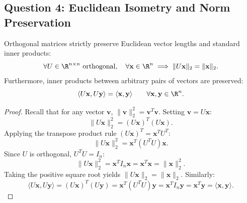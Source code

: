 \subsection{Question 4: Euclidean Isometry and Norm Preservation}

\begin{theorem}
\label{thm:en:orthogonal-isometry}
Orthogonal matrices strictly preserve Euclidean vector lengths and standard inner products:
\begin{equation}
    \forall U \in \R^{n \times n} \text{ orthogonal}, \quad \forall \mathbf{x} \in \R^n \implies \|U\mathbf{x}\|_2 = \|\mathbf{x}\|_2.
\end{equation}
Furthermore, inner products between arbitrary pairs of vectors are preserved:
\begin{equation}
    \langle U\mathbf{x}, U\mathbf{y} \rangle = \langle \mathbf{x}, \mathbf{y} \rangle \qquad \forall \mathbf{x}, \mathbf{y} \in \R^n.
\end{equation}
\end{theorem}

\begin{proof}
Recall that for any vector $\mathbf{v}$, $\|\mathbf{v}\|_2^2 = \mathbf{v}^T \mathbf{v}$. Setting $\mathbf{v} = U\mathbf{x}$:
\begin{equation}
    \|U\mathbf{x}\|_2^2 = (U\mathbf{x})^T (U\mathbf{x}).
\end{equation}
Applying the transpose product rule $(U\mathbf{x})^T = \mathbf{x}^T U^T$:
\begin{equation}
    \|U\mathbf{x}\|_2^2 = \mathbf{x}^T (U^T U) \mathbf{x}.
\end{equation}
Since $U$ is orthogonal, $U^T U = I_n$:
\begin{equation}
    \|U\mathbf{x}\|_2^2 = \mathbf{x}^T I_n \mathbf{x} = \mathbf{x}^T \mathbf{x} = \|\mathbf{x}\|_2^2.
\end{equation}
Taking the positive square root yields $\|U\mathbf{x}\|_2 = \|\mathbf{x}\|_2$. Similarly:
\begin{equation}
    \langle U\mathbf{x}, U\mathbf{y} \rangle = (U\mathbf{x})^T (U\mathbf{y}) = \mathbf{x}^T (U^T U) \mathbf{y} = \mathbf{x}^T I_n \mathbf{y} = \mathbf{x}^T \mathbf{y} = \langle \mathbf{x}, \mathbf{y} \rangle.
\end{equation}
\end{proof}

